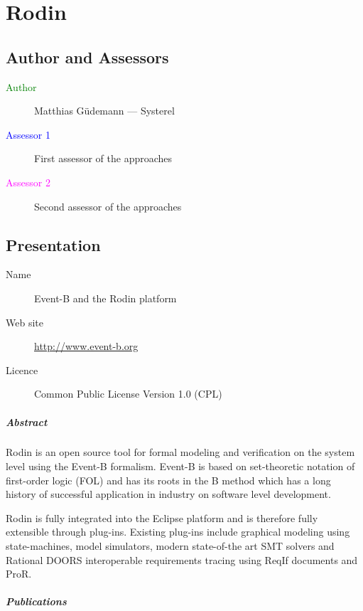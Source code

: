\chapter{Rodin}
\label{sec:rodin}

\section{Author and Assessors}

\begin{description}
\item[\textcolor{green}{Author}] Matthias Güdemann --- Systerel
\item[\textcolor{blue}{Assessor 1}] First assessor of the approaches 
\item[\textcolor{magenta}{Assessor 2}] Second assessor of the approaches 
\end{description}

\section{Presentation}

\begin{description}
\item[Name] Event-B and the Rodin platform
\item[Web site] \url{http://www.event-b.org}
\item[Licence] Common Public License Version 1.0 (CPL)
\end{description}

\paragraph{Abstract}

Rodin is an open source tool for formal modeling and verification on the system
level using the Event-B formalism. Event-B is based on set-theoretic notation of
first-order logic (FOL) and has its roots in the B method which has a long
history of successful application in industry on software level development.

Rodin is fully integrated into the Eclipse platform and is therefore fully
extensible through plug-ins. Existing plug-ins include graphical modeling using
state-machines, model simulators, modern state-of-the art SMT solvers and
Rational DOORS interoperable requirements tracing using ReqIf documents and
ProR.

\paragraph{Publications}

